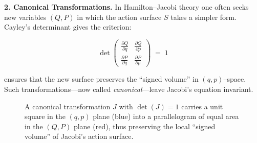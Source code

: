 \textbf{2. Canonical Transformations.}  
In Hamilton–Jacobi theory one often seeks new variables \((Q,P)\) in which the action surface \(S\) takes a simpler form.  Cayley’s determinant gives the criterion:

\[
\det
\begin{pmatrix}
\displaystyle \frac{\partial Q}{\partial q} & \displaystyle \frac{\partial Q}{\partial p}\\[8pt]
\displaystyle \frac{\partial P}{\partial q} & \displaystyle \frac{\partial P}{\partial p}
\end{pmatrix}
\;=\;1
\]

ensures that the new surface preserves the “signed volume” in \((q,p)\)–space.  Such transformations—now called \emph{canonical}—leave Jacobi’s equation invariant.


\begin{figure}[H]
    \centering
    \caption{A canonical transformation \(J\) with \(\det(J)=1\) carries a unit square in the \((q,p)\) plane (blue) into a parallelogram of equal area in the \((Q,P)\) plane (red), thus preserving the local “signed volume” of Jacobi’s action surface.}
\end{figure}





